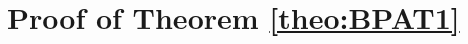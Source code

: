 \documentclass[preprint,12pt,authoryear]{elsarticle}
\begin{document}








\appendix
\section{Proof of Theorem \ref{theo:BPAT1}}\label{app:thm1}
\end{document}
